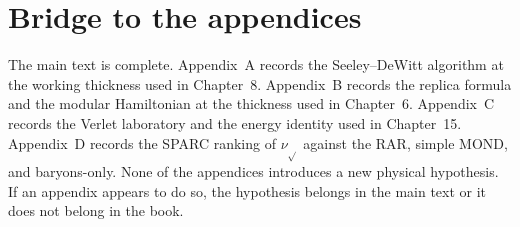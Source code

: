\section{Bridge to the appendices}
\label{sec:ch17-bridge}

The main text is complete. Appendix~A records the Seeley--DeWitt
algorithm at the working thickness used in Chapter~8.
Appendix~B records the replica formula and the modular Hamiltonian
at the thickness used in Chapter~6. Appendix~C records the
Verlet laboratory and the energy identity used in Chapter~15.
Appendix~D records the SPARC ranking of \(\nu_{\sqrt{}}\) against
the RAR, simple MOND, and baryons-only. None of the appendices
introduces a new physical hypothesis. If an appendix appears to
do so, the hypothesis belongs in the main text or it does not
belong in the book.
